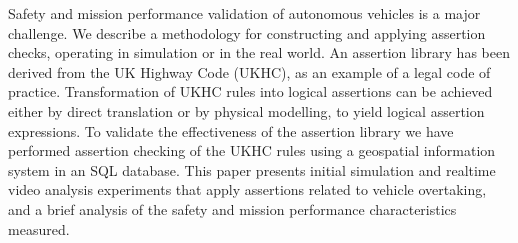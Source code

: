 Safety and mission performance validation of autonomous vehicles is a major challenge. We describe a methodology for constructing and applying assertion checks, operating in simulation or in the real world. 
%
An assertion library has been derived from the UK Highway Code (UKHC), as an example of a legal code of practice. 
%
Transformation of UKHC rules into logical assertions can be achieved either by direct translation or by physical modelling, to yield logical assertion expressions.
%
To validate the effectiveness of the assertion library we have performed assertion checking of the UKHC rules using a geospatial information system in an SQL database.
%
This paper presents initial simulation and realtime video analysis experiments that apply assertions related to vehicle overtaking, and a brief analysis of the safety and mission performance characteristics measured.

